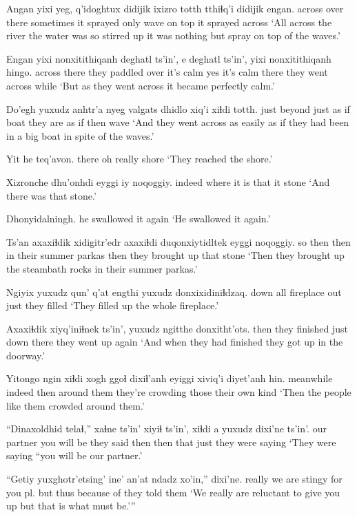 \documentclass[12pt]{article}
\begin{document}
\gll Angan {yixi yeg,} q'idoghtux didijik ixizro totth tthiɬq'i didijik engan.
across {over there} sometimes {it sprayed} only wave {on top} {it sprayed} across
\glt `All across the river the water was so stirred up it was nothing but spray on top of the waves.'
\glend

\gll Engan yixi nonxitithiqanh deghatl ts'in',  e deghatl ts'in', yixi nonxitithiqanh hingo.
across there {they paddled over} {it's calm } {} yes  {it's calm} {} there {they went across} while
\glt `But as they went across it became perfectly calm.'
\glend

\gll Do'egh yuxudz {anhtr'a nyeg} valgats dhidlo xiq'i  xiɬdi totth.
{just beyond} just  {as if} boat {they are} {as if } then wave
\glt `And they went across as easily as if they had been in a big boat in spite of the waves.'
\glend

\gll Yit he teq'avon.
there {oh really} shore
\glt `They reached the shore.'
\glend

\gll Xizronche dhu'onhdi eyggi iy noqoggiy.
indeed  {where it is}  that it stone
\glt `And there was that stone.'
\glend

\gll Dhonyidalningh.
{{he swallowed it again}}
\glt `He swallowed it again.'
\glend

\gll Ts'an axaxiɬdik xidigitr'edr  axaxiɬdi duqonxiytidltek eyggi noqoggiy.
{so then} then {in their summer parkas} then {they brought up} that stone
\glt `Then they brought up the steambath rocks in their summer parkas.'
\glend

\gll Ngiyix yuxudz {qun' q'at} engthi yuxudz  donxixidiniɬdzaq.
down all fireplace out just {they filled}
\glt `They filled up the whole fireplace.'
\glend

\gll Axaxiɬdik xiyq'iniɬnek ts'in', yuxudz ngitthe donxitht'ots.
then {they finished} {} just {down there} {they went up again}
\glt `And when they had finished they got up in the doorway.'
\glend

\gll Yitongo ngin xiɬdi xogh {ggoɬ dixiɬ'anh} eyiggi {xiviq'i diyet'anh hin.}
meanwhile indeed then {around them} {they're crowding} those {their own kind}
\glt `Then the people like them crowded around them.'
\glend

\gll  ``Dinaxoldhid telaɬ,''  xaɬne  ts'in' xiyiɬ ts'in', xiɬdi a yuxudz dixi'ne  ts'in'.
{our partner} {you will be} {they said} {} then {} then that just {they were saying} 
\glt `They were saying ``you will be our partner.'
\glend

\gll ``Getiy  yuxghotr'etsing'   {ine' an'at} ndadz xo'in,'' dixi'ne.
really  {we are stingy for you pl.} but thus {because of} {they told them }
\glt `We really are reluctant to give you up but that is what must be.'''
\glend
\end{document}
